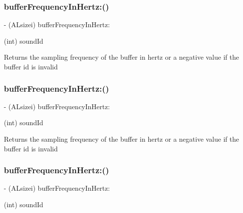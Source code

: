 \subsubsection{\texorpdfstring{buffer\+Frequency\+In\+Hertz\+:()}{bufferFrequencyInHertz:()}\hspace{0.1cm}{\footnotesize\ttfamily [1/4]}}
{\footnotesize\ttfamily -\/ (A\+Lsizei) buffer\+Frequency\+In\+Hertz\+: \begin{DoxyParamCaption}\item[{(int)}]{sound\+Id }\end{DoxyParamCaption}}

Returns the sampling frequency of the buffer in hertz or a negative value if the buffer id is invalid \mbox{\label{interfaceCDSoundEngine_af8559b48f34ad22ba9a7cf27ffcb8648}} 
\subsubsection{\texorpdfstring{buffer\+Frequency\+In\+Hertz\+:()}{bufferFrequencyInHertz:()}\hspace{0.1cm}{\footnotesize\ttfamily [2/4]}}
{\footnotesize\ttfamily -\/ (A\+Lsizei) buffer\+Frequency\+In\+Hertz\+: \begin{DoxyParamCaption}\item[{(int)}]{sound\+Id }\end{DoxyParamCaption}}

Returns the sampling frequency of the buffer in hertz or a negative value if the buffer id is invalid \mbox{\label{interfaceCDSoundEngine_af8559b48f34ad22ba9a7cf27ffcb8648}} 
\subsubsection{\texorpdfstring{buffer\+Frequency\+In\+Hertz\+:()}{bufferFrequencyInHertz:()}\hspace{0.1cm}{\footnotesize\ttfamily [3/4]}}
{\footnotesize\ttfamily -\/ (A\+Lsizei) buffer\+Frequency\+In\+Hertz\+: \begin{DoxyParamCaption}\item[{(int)}]{sound\+Id }\end{DoxyParamCaption}}

